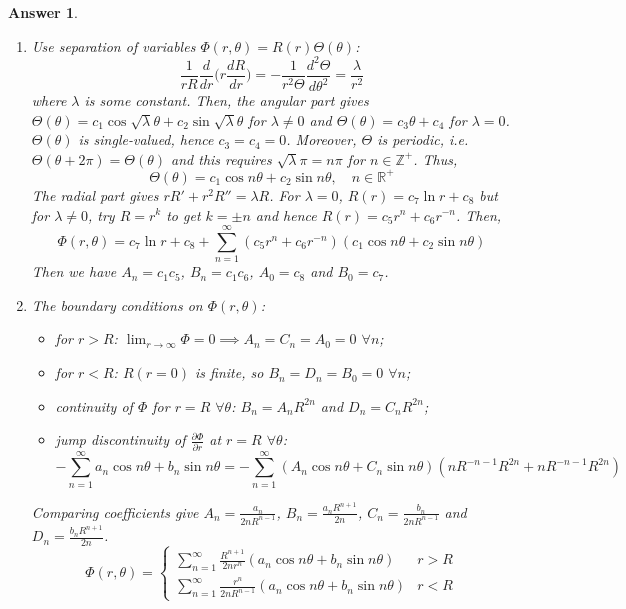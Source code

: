 \documentclass[a4paper]{article}
\newtheorem{ans}{Answer}[section]
\theoremstyle{new}
\begin{document}
\begin{ans}\leavevmode
\begin{enumerate}[label=(\alph*)]
\item Use separation of variables $\Phi(r,\theta)=R(r)\Theta(\theta)$:
$$\frac{1}{rR}\frac{d}{dr}\bigg(r\frac{dR}{dr}\bigg)=-\frac{1}{r^2\Theta}\frac{d^2\Theta}{d\theta^2}=\frac{\lambda}{r^2}$$
where $\lambda$ is some constant. Then, the angular part gives $\Theta(\theta)=c_1\cos\sqrt{\lambda}\theta+c_2\sin\sqrt{\lambda}\theta$ for $\lambda\neq 0$ and $\Theta(\theta)=c_3\theta+c_4$ for $\lambda=0$. $\Theta(\theta)$ is single-valued, hence $c_3=c_4=0$. Moreover, $\Theta$ is periodic, i.e. $\Theta(\theta+2\pi)=\Theta(\theta)$ and this requires $\sqrt{\lambda}\pi=n\pi$ for $n\in\mathbb{Z}^+$. Thus, $$\Theta(\theta)=c_1\cos n\theta+c_2\sin n\theta,\quad n\in\mathbb{R}^+$$
The radial part gives $rR'+r^2R''=\lambda R$. For $\lambda=0$, $R(r)=c_7\ln r+c_8$ but for $\lambda\neq 0$, try $R=r^k$ to get $k=\pm n$ and hence $R(r)=c_5r^n+c_6r^{-n}$. Then,
$$\Phi(r,\theta)=c_7\ln r+c_8+\sum_{n=1}^\infty(c_5r^n+c_6r^{-n})(c_1\cos n\theta+c_2\sin n\theta)$$
Then we have $A_n=c_1c_5$, $B_n=c_1c_6$, $A_0=c_8$ and $B_0=c_7$.
\newpage
\item The boundary conditions on $\Phi(r,\theta)$:
\begin{itemize}
    \item  for $r>R$: $\lim_{r\rightarrow\infty}\Phi=0\implies A_n=C_n=A_0=0$ $\forall n$;
    \item for $r<R$: $R(r=0)$ is finite, so $B_n=D_n=B_0=0$ $\forall n$;
    \item continuity of $\Phi$ for $r=R$ $\forall\theta$: $B_n=A_nR^{2n}$ and $D_n=C_nR^{2n}$;
    \item jump discontinuity of $\frac{\partial\Phi}{\partial r}$ at $r=R$ $\forall\theta$:
    $$-\sum_{n=1}^\infty a_n\cos n\theta+b_n\sin n\theta=-\sum_{n=1}^\infty(A_n\cos n\theta+C_n\sin n\theta)(nR^{-n-1}R^{2n}+nR^{-n-1}R^{2n})$$
\end{itemize}
Comparing coefficients give $A_n=\frac{a_n}{2nR^{n-1}}$, $B_n=\frac{a_nR^{n+1}}{2n}$,  $C_n=\frac{b_n}{2nR^{n-1}}$ and $D_n=\frac{b_nR^{n+1}}{2n}$.
$$\Phi(r,\theta)=
\left\{
        \begin{array}{ll}
      \sum_{n=1}^\infty\frac{R^{n+1}}{2nr^n}(a_n\cos n\theta+b_n\sin n\theta) & r>R \\
      \sum_{n=1}^\infty\frac{r^n}{2nR^{n-1}}(a_n\cos n\theta+b_n\sin n\theta) & r<R
        \end{array}
    \right.$$
\end{enumerate}
\end{ans}
\end{document}

